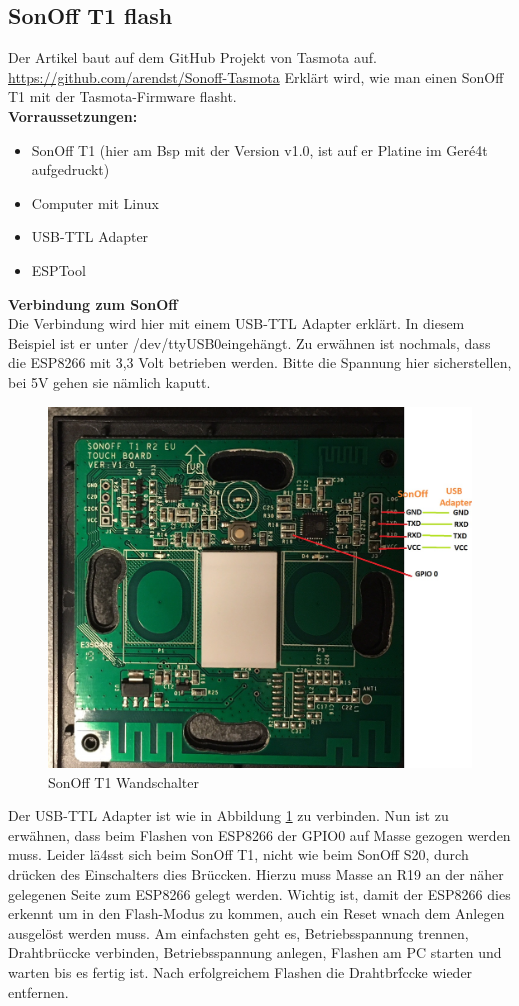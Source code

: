 \documentclass[11pt,fleqn]{book} %
\numberwithin{equation}{section} %
\numberwithin{figure}{section} %
\numberwithin{table}{section} %
\begin{document}
 \subsection{SonOff T1 flash}
Der Artikel baut auf dem GitHub Projekt von Tasmota auf. \url{https://github.com/arendst/Sonoff-Tasmota} Erklärt wird, wie man einen SonOff T1 mit der Tasmota-Firmware flasht.\\
\textbf{Vorraussetzungen:}
\begin{itemize}
\item SonOff T1 (hier am Bsp mit der Version v1.0, ist auf er Platine im Ger\'e4t aufgedruckt)
\item Computer mit Linux
\item USB-TTL Adapter
\item ESPTool
\end{itemize}
\textbf{Verbindung zum SonOff}\\
Die Verbindung wird hier mit einem USB-TTL Adapter erklärt. In diesem Beispiel ist er unter \glqq /dev/ttyUSB0\grqq eingehängt. Zu erwähnen ist nochmals, dass die ESP8266 mit 3,3 Volt betrieben werden. Bitte die Spannung hier sicherstellen, bei 5V gehen sie nämlich kaputt.
\begin{figure}[!h]%
\centering
\includegraphics[scale=0.23]{Pictures/sonoff_t1.jpg}
\caption{SonOff T1 Wandschalter\label{pic:sonoff-t1-connect} }
\end{figure}
Der USB-TTL Adapter ist wie in Abbildung \ref{pic:sonoff-t1-connect} zu verbinden. Nun ist zu erwähnen, dass beim Flashen von ESP8266 der GPIO0 auf Masse gezogen werden muss. Leider lä4sst sich beim SonOff T1, nicht wie beim SonOff S20, durch drücken des Einschalters dies Brüccken. Hierzu muss Masse an R19 an der näher gelegenen Seite zum ESP8266 gelegt werden. Wichtig ist, damit der ESP8266 dies erkennt um in den Flash-Modus zu kommen, auch ein Reset wnach dem Anlegen ausgelöst werden muss. Am einfachsten geht es, Betriebsspannung trennen, Drahtbrüccke verbinden, Betriebsspannung anlegen, Flashen am PC starten und warten bis es fertig ist. Nach erfolgreichem Flashen die Drahtbr\'fccke wieder entfernen.\\
\end{document}
